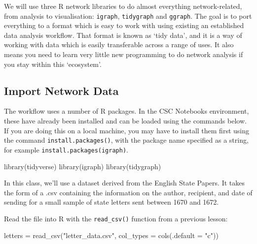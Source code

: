 \documentclass[
]{book}
\newenvironment{Shaded}{\begin{snugshade}}{\end{snugshade}}
\newcommand{\AttributeTok}[1]{\textcolor[rgb]{0.77,0.63,0.00}{#1}}
\newcommand{\FunctionTok}[1]{\textcolor[rgb]{0.00,0.00,0.00}{#1}}
\newcommand{\NormalTok}[1]{#1}
\newcommand{\OtherTok}[1]{\textcolor[rgb]{0.56,0.35,0.01}{#1}}
\newcommand{\StringTok}[1]{\textcolor[rgb]{0.31,0.60,0.02}{#1}}
\begin{document}
We will use three R network libraries to do almost everything network-related, from analysis to visualisation: \texttt{igraph}, \texttt{tidygraph} and \texttt{ggraph}. The goal is to port everything to a format which is easy to work with using existing an established data analysis workflow. That format is known as `tidy data', and it is a way of working with data which is easily transferable across a range of uses. It also means you need to learn very little new programming to do network analysis if you stay within this `ecosystem'.

\hypertarget{import-network-data}{%
\subsection{Import Network Data}\label{import-network-data}}

The workflow uses a number of R packages. In the CSC Notebooks environment, these have already been installed and can be loaded using the commands below. If you are doing this on a local machine, you may have to install them first using the command \texttt{install.packages()}, with the package name specified as a string, for example \texttt{install.packages(\textquotesingle{}igraph\textquotesingle{})}.

\begin{Shaded}
\begin{Highlighting}[]
\FunctionTok{library}\NormalTok{(tidyverse)}
\FunctionTok{library}\NormalTok{(igraph)}
\FunctionTok{library}\NormalTok{(tidygraph)}
\end{Highlighting}
\end{Shaded}

In this class, we'll use a dataset derived from the English State Papers. It takes the form of a .csv containing the information on the author, recipient, and date of sending for a small sample of state letters sent between 1670 and 1672.

Read the file into R with the \texttt{read\_csv()} function from a previous lesson:

\begin{Shaded}
\begin{Highlighting}[]
\NormalTok{letters }\OtherTok{=} \FunctionTok{read\_csv}\NormalTok{(}\StringTok{"letter\_data.csv"}\NormalTok{, }\AttributeTok{col\_types =} \FunctionTok{cols}\NormalTok{(}\AttributeTok{.default =} \StringTok{"c"}\NormalTok{))}
\end{Highlighting}
\end{Shaded}
\end{document}

